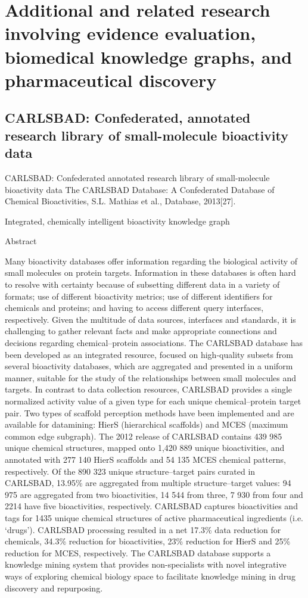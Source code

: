 \chapter{Additional and related research involving evidence evaluation, biomedical knowledge graphs, and pharmaceutical discovery}

\section{CARLSBAD: Confederated, annotated research library of small-molecule bioactivity data}

CARLSBAD: Confederated annotated research library of small-molecule bioactivity data
The CARLSBAD Database: A Confederated Database of Chemical Bioactivities, S.L. Mathias et al., Database, 2013[27].

Integrated, chemically intelligent bioactivity knowledge graph

Abstract

Many bioactivity databases offer information regarding the biological activity of small molecules on protein targets. Information in these databases is often hard to resolve with certainty because of subsetting different data in a variety of formats; use of different bioactivity metrics; use of different identifiers for chemicals and proteins; and having to access different query interfaces, respectively. Given the multitude of data sources, interfaces and standards, it is challenging to gather relevant facts and make appropriate connections and decisions regarding chemical–protein associations. The CARLSBAD database has been developed as an integrated resource, focused on high-quality subsets from several bioactivity databases, which are aggregated and presented in a uniform manner, suitable for the study of the relationships between small molecules and targets. In contrast to data collection resources, CARLSBAD provides a single normalized activity value of a given type for each unique chemical–protein target pair. Two types of scaffold perception methods have been implemented and are available for datamining: HierS (hierarchical scaffolds) and MCES (maximum common edge subgraph). The 2012 release of CARLSBAD contains 439 985 unique chemical structures, mapped onto 1,420 889 unique bioactivities, and annotated with 277 140 HierS scaffolds and 54 135 MCES chemical patterns, respectively. Of the 890 323 unique structure–target pairs curated in CARLSBAD, 13.95\% are aggregated from multiple structure–target values: 94 975 are aggregated from two bioactivities, 14 544 from three, 7 930 from four and 2214 have five bioactivities, respectively. CARLSBAD captures bioactivities and tags for 1435 unique chemical structures of active pharmaceutical ingredients (i.e. ‘drugs’). CARLSBAD processing resulted in a net 17.3\% data reduction for chemicals, 34.3\% reduction for bioactivities, 23\% reduction for HierS and 25\% reduction for MCES, respectively. The CARLSBAD database supports a knowledge mining system that provides non-specialists with novel integrative ways of exploring chemical biology space to facilitate knowledge mining in drug discovery and repurposing.


